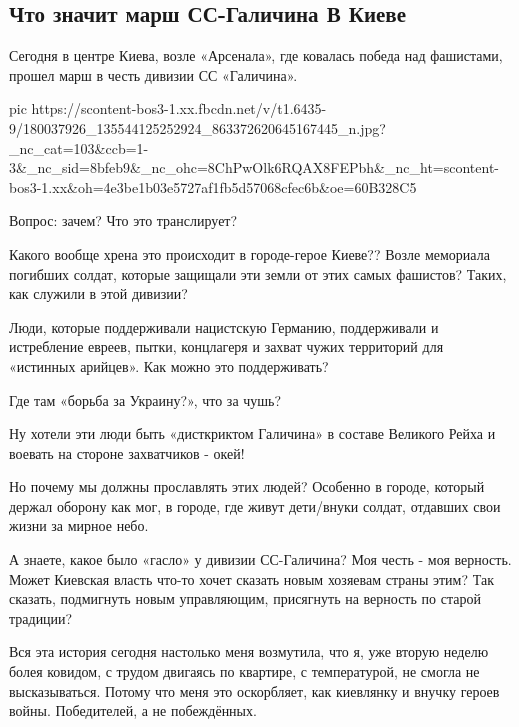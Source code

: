  
 
 
 
 

\subsection{Что значит марш СС-Галичина В Киеве}

Сегодня в центре Киева, возле «Арсенала», где ковалась победа над фашистами,
прошел марш в честь дивизии СС «Галичина». 

\ifcmt
  pic https://scontent-bos3-1.xx.fbcdn.net/v/t1.6435-9/180037926_135544125252924_863372620645167445_n.jpg?_nc_cat=103&ccb=1-3&_nc_sid=8bfeb9&_nc_ohc=8ChPwOlk6RQAX8FEPbh&_nc_ht=scontent-bos3-1.xx&oh=4e3be1b03e5727af1fb5d57068cfec6b&oe=60B328C5
\fi

Вопрос: зачем? Что это транслирует?

Какого вообще хрена это происходит в городе-герое Киеве?? Возле мемориала
погибших солдат, которые защищали эти земли от этих самых фашистов? Таких, как
служили в этой дивизии? 

Люди, которые поддерживали нацистскую Германию, поддерживали и истребление
евреев, пытки, концлагеря и захват чужих территорий для «истинных арийцев». Как
можно это поддерживать? 

Где там «борьба за Украину?», что за чушь?

Ну хотели эти люди быть «дисткриктом Галичина» в составе Великого Рейха и
воевать на стороне захватчиков - окей! 

Но почему мы должны прославлять этих людей? Особенно в городе, который держал
оборону как мог, в городе, где живут дети/внуки солдат, отдавших свои жизни за
мирное небо.

А знаете, какое было «гасло» у дивизии СС-Галичина? Моя честь - моя верность.
Может Киевская власть что-то хочет сказать новым хозяевам страны этим? Так
сказать, подмигнуть новым управляющим, присягнуть на верность по старой
традиции? 

Вся эта история сегодня настолько меня возмутила, что я, уже вторую неделю
болея ковидом, с трудом двигаясь по квартире, с температурой, не смогла не
высказываться. Потому что меня это оскорбляет, как киевлянку и внучку героев
войны. Победителей, а не побеждённых. 


